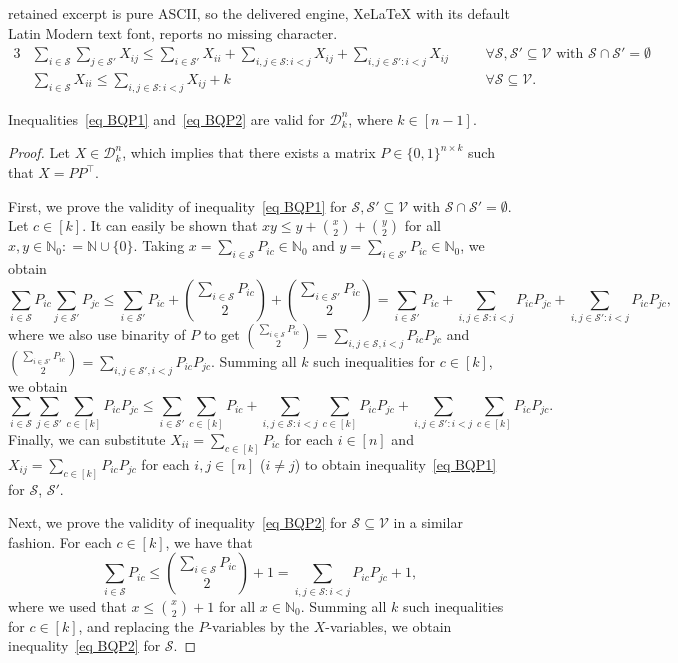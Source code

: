 \documentclass[10pt,a4paper]{amsart}
\newcommand{\eqdef}{\mathrel{\mathop:}=}
\newcommand{\mc}{\mathcal}
\begin{document}
retained excerpt is pure ASCII, so the delivered engine, XeLaTeX with its default Latin Modern text font, reports no missing character.
\begin{alignat}{3}
    & \sum_{i \in \mc{S}}\sum_{j \in \mc{S}'} X_{ij} \leq \sum_{i \in \mc{S}'}X_{ii} + \sum_{i,j \in \mc{S}: i<j} X_{ij} + \sum_{i,j \in \mc{S}': i<j} X_{ij} &\quad& \forall \mc{S}, \mc{S}' \subseteq \mc{V} \text{ with } \mc{S} \cap \mc{S}' = \emptyset \label{eq BQP1} \\
    & \sum_{i \in \mc{S}} X_{ii} \leq \sum_{i,j \in \mc{S}: i<j} X_{ij} + k &\quad& \forall \mc{S} \subseteq \mc{V}. \label{eq BQP2}
\end{alignat}

\begin{theorem}\label{thm:bqp1}
    Inequalities~\eqref{eq BQP1} and~\eqref{eq BQP2} are valid for $\mc{D}^n_k$, 
    where $k \in [n-1]$.
\end{theorem}

\begin{proof}
    Let $X \in \mc{D}^n_k$, which implies that there exists a matrix $P \in \{0,1\}^{n \times k}$ such that $X = PP^\top$. 
    
    First, we prove the validity of inequality~\eqref{eq BQP1} for $\mc{S}, \mc{S}' \subseteq \mc{V}$ with $\mc{S} \cap \mc{S}' = \emptyset$.
    Let $c \in [k]$. 
    It can easily be shown that $xy \leq y + \binom{x}{2} +
    \binom{y}{2}$ for all $x, y \in \mathbb{N}_0 {\eqdef \mathbb{N} \cup \{0\}}$. 
    Taking $x = \sum_{i \in \mc{S}} P_{ic} \in \mathbb{N}_0$ and $y = \sum_{i \in \mc{S}'} P_{ic} \in \mathbb{N}_0$, we obtain 
    $$\sum_{i \in \mc{S}} P_{ic} \sum_{j \in \mc{S}'} P_{jc} \leq \sum_{i \in \mc{S}'} P_{ic} + \binom{\sum_{i \in \mc{S}} P_{ic}}{2} + \binom{\sum_{i \in \mc{S}'} P_{ic}}{2} = \sum_{i \in \mc{S}'} P_{ic} + \sum_{i,j \in \mc{S}: i < j} P_{ic}P_{jc} + \sum_{i,j \in \mc{S}': i < j} P_{ic}P_{jc},$$
    where we also use binarity of $P$ to get $\binom{\sum_{i \in \mc{S}} P_{ic}}{2} = \sum_{i,j \in \mc{S}, i < j} P_{ic} P_{jc}$ and $\binom{\sum_{i \in \mc{S}'} P_{ic}}{2} = \sum_{i,j \in \mc{S}', i < j} P_{ic} P_{jc}$.
    Summing all $k$ such inequalities for $c \in [k]$, we obtain 
    $$\sum_{i \in \mc{S}} \sum_{j \in \mc{S}'} \sum_{c \in [k]} P_{ic}P_{jc} \leq  \sum_{i \in \mc{S}'}\sum_{c \in [k]} P_{ic} + \sum_{i,j \in \mc{S}: i < j} \sum_{c \in [k]} P_{ic}P_{jc} + \sum_{i,j \in \mc{S}': i < j} \sum_{c \in [k]} P_{ic}P_{jc}.$$ 
    Finally, we can substitute $X_{ii} = \sum_{c \in [k]} P_{ic}$ for each $i \in [n]$ and $X_{ij} = \sum_{c \in [k]} P_{ic}P_{jc}$ for each $i, j \in [n]$ ($i \neq j$) to obtain inequality~\eqref{eq BQP1} for $\mc{S}$, $\mc{S}'$.  

    Next, we prove the validity of inequality~\eqref{eq BQP2} for $\mc{S} \subseteq \mc{V}$ in a similar fashion.
    For each $c \in [k]$, we have that
    $$\sum_{i \in \mc{S}} P_{ic} \leq \binom{\sum_{i \in \mc{S}} P_{ic}}{2} + 1 = \sum_{i, j \in \mc{S}: i < j} P_{ic} P_{jc} + 1,$$
    where we used that $x \leq \binom{x}{2} + 1$ for all $x \in \mathbb{N}_0$. 
    Summing all $k$ such inequalities for $c \in [k]$, and replacing the $P$-variables by the $X$-variables, we obtain inequality~\eqref{eq BQP2} for $\mc{S}$.
\end{proof}
\end{document}
